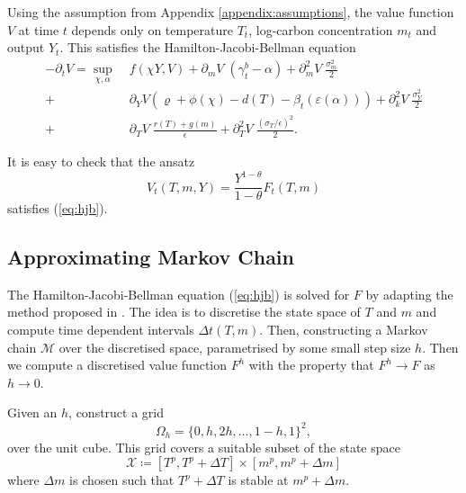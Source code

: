 \documentclass[../../main.tex]{subfiles}
\begin{document}
Using the assumption from Appendix \ref{appendix:assumptions}, the value function $V$ at time $t$ depends only on temperature $T_t$, log-carbon concentration $m_t$ and output $Y_t$. This satisfies the Hamilton-Jacobi-Bellman equation \begin{equation} \label{eq:hjb}
    \begin{split}
        -\partial_t V = \sup_{\chi, \alpha} \; &f(\chi Y, V) + \partial_m V \; (\gamma^b_t - \alpha) + \partial_m^2 V \; \frac{\sigma_m^2}{2}  \\ 
        + \; &\partial_Y V (\varrho + \phi(\chi) - d(T) - \beta_t(\varepsilon(\alpha))) +  \partial_k^2 V \; \frac{\sigma_Y^2}{2} \\
        + \; &\partial_T V \; \frac{r(T) + g(m)}{\epsilon} + \partial_T^2 V \; \frac{(\sigma_T / \epsilon)^2}{2}. 
    \end{split}
\end{equation}

It is easy to check that the ansatz \begin{equation} \label{eq:ansatz}
    V_t(T, m, Y) = \frac{Y^{1 - \theta}}{1 - \theta} F_t(T, m) 
\end{equation} satisfies (\ref{eq:hjb}). 

\subsection{Approximating Markov Chain} \label{appendix:approximating-markov-chain}

The Hamilton-Jacobi-Bellman equation (\ref{eq:hjb}) is solved for $F$ by adapting the method proposed in \cite{kushner_numerical_2001}. The idea is to discretise the state space of $T$ and $m$ and compute time dependent intervals $\Delta t(T, m)$. Then, constructing a Markov chain $\mathcal{M}$ over the discretised space, parametrised by some small step size $h$. Then we compute a discretised value function $F^h$ with the property that $F^h \to F$ as $h \to 0$.

Given an $h$, construct a grid \begin{equation}
    \Omega_h = \{0, h, 2h, \ldots, 1 - h, 1\}^2,
\end{equation} over the unit cube. This grid covers a suitable subset of the state space \begin{equation}
    \mathcal{X} \coloneqq [T^p, T^p + \Delta T] \times [m^p, m^p + \Delta m] 
\end{equation} where $\Delta m$ is chosen such that $T^p + \Delta T$ is stable at $m^p + \Delta m$.
\end{document}
